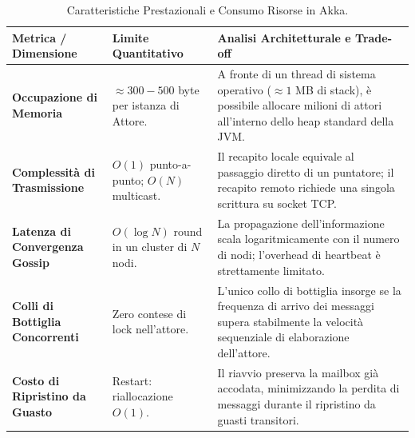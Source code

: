 \begin{table}[htbp]
\centering
\small
\begin{tabularx}{\textwidth}{l p{3.5cm} X}
\toprule
\textbf{Metrica / Dimensione} & \textbf{Limite Quantitativo} & \textbf{Analisi Architetturale e Trade-off} \\
\midrule
\textbf{Occupazione di Memoria} & $\approx 300 - 500$ byte per istanza di Attore. & A fronte di un thread di sistema operativo ($\approx 1$ MB di stack), è possibile allocare milioni di attori all'interno dello heap standard della JVM. \\
\midrule
\textbf{Complessità di Trasmissione} & $O(1)$ punto-a-punto; \newline $O(N)$ multicast. & Il recapito locale equivale al passaggio diretto di un puntatore; il recapito remoto richiede una singola scrittura su socket TCP. \\
\midrule
\textbf{Latenza di Convergenza Gossip} & $O(\log N)$ round in un cluster di $N$ nodi. & La propagazione dell'informazione scala logaritmicamente con il numero di nodi; l'overhead di heartbeat è strettamente limitato. \\
\midrule
\textbf{Colli di Bottiglia Concorrenti} & Zero contese di lock nell'attore. & L'unico collo di bottiglia insorge se la frequenza di arrivo dei messaggi supera stabilmente la velocità sequenziale di elaborazione dell'attore. \\
\midrule
\textbf{Costo di Ripristino da Guasto} & Restart: riallocazione $O(1)$. & Il riavvio preserva la mailbox già accodata, minimizzando la perdita di messaggi durante il ripristino da guasti transitori. \\
\bottomrule
\end{tabularx}
\caption{Caratteristiche Prestazionali e Consumo Risorse in Akka.}
\label{tab:system_complexity_it}
\end{table}


